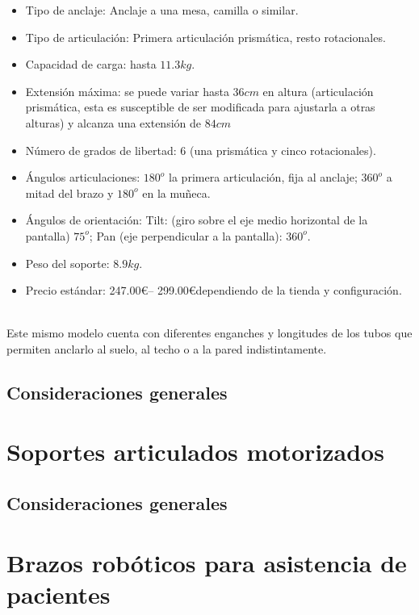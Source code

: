  \begin{minipage}{0.65\textwidth}\raggedright
 	\hspace{1cm}
 	\begin{itemize}
 		\item Tipo de anclaje: Anclaje a una mesa, camilla o similar.
 		\item Tipo de articulación: Primera articulación prismática, resto rotacionales.
 		\item Capacidad de carga: hasta $11.3kg$.
 		\item Extensión máxima: se puede variar hasta $36cm$ en altura (articulación prismática, esta es susceptible de ser modificada para ajustarla a otras alturas) y alcanza una extensión de $84cm$
 		\item Número de grados de libertad: 6 (una prismática y cinco rotacionales).
 		\item Ángulos articulaciones: $180^o$ la primera articulación, fija al anclaje; $360^o$ a mitad del brazo y $180^o$ en la muñeca.
 		\item Ángulos de orientación: Tilt: (giro sobre el eje medio horizontal de la pantalla) $75^o$; Pan (eje perpendicular a la pantalla): $360^o$.
 		\item Peso del soporte: $8.9kg$.
 		\item Precio estándar: 247.00\euro – 299.00\euro dependiendo de la tienda y configuración.
 	\end{itemize}
 \end{minipage}
 \\ 
 
 \vspace{0.1cm} 
 Este mismo modelo cuenta con diferentes enganches y longitudes de los tubos que permiten anclarlo al suelo, al techo o a la pared indistintamente.
 
 \subsection{Consideraciones generales}

\section{Soportes articulados motorizados}
 \subsection{Consideraciones generales}
 
\section{Brazos robóticos para asistencia de pacientes} 

